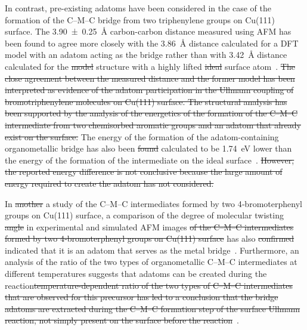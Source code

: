 \documentclass[aps,prb,amsmath,amssymb,11pt]{revtex4-1}
\newcommand{\zhzh}{\color{blue}}
\begin{document}
{\zhzh In contrast,} pre-existing adatoms have been considered in the case of the formation of the C--M--C bridge from two triphenylene groups on Cu(111) surface. 
The \SI{3.90\pm 0.25}{\angstrom} carbon-carbon distance measured using AFM has been found to agree more closely with the \SI{3.86}{\angstrom} distance calculated for a DFT model with an adatom acting as the bridge rather than with \SI{3.42}{\angstrom} distance calculated for the \sout{model} {\zhzh structure} with a highly lifted \sout{ideal} surface atom~\cite{acsnano2017}. 
\sout{The close agreement between the measured distance and the former model has been interpreted as evidence of the adatom participation in the Ullmann coupling of bromotriphenylene molecules on Cu(111) surface.
The structural analysis has been supported by the analysis of the energetics of the formation of the C--M--C intermediate from two chemisorbed aromatic groups and an adatom that already exist on the surface.} The energy of the formation of the {\zhzh adatom-containing} organometallic bridge has {\zhzh also} been \sout{found} {\zhzh calculated} to be \SI{1.74}{\electronvolt} lower than the energy of the formation of the intermediate on the ideal surface~\cite{acsnano2017}. \sout{However, the reported energy difference is not conclusive because the large amount of energy required to create the adatom has not considered.} %

In \sout{another} {\zhzh a} study {\zhzh of the C--M--C intermediates formed by two 4‐bromoterphenyl groups on Cu(111) surface}, a comparison of the {\zhzh degree of molecular} twisting \sout{angle} in experimental and simulated AFM images \sout{of the C--M--C intermediates formed by two 4‐bromoterphenyl groups on Cu(111) surface} 
has also \sout{confirmed} {\zhzh indicated} that it is an adatom that serves as the metal bridge~\cite{acsnano2019}. Furthermore, an analysis of the {\zhzh  ratio of the two types of organometallic C--M--C intermediates at different temperatures suggests that adatoms can be created during the reaction}\sout{temperature-dependent ratio of the two types of C--M--C intermediates that are observed for this precursor has led to a conclusion that the bridge adatoms are extracted during the C--M--C formation step of the surface Ullmann reaction, not simply present on the surface before the reaction}~\cite{acsnano2019}. 
\end{document}
